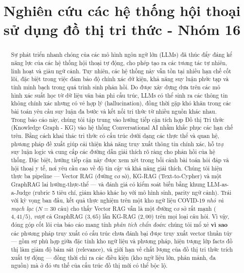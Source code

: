 \documentclass[conference]{IEEEtran}
\begin{document}
\title{Nghiên cứu các hệ thống hội thoại sử dụng đồ thị tri thức - Nhóm 16\\}

\author{
\and
{}
\and
{}
\and
{}
\and
{}
}

\maketitle

\begin{abstract}
Sự phát triển nhanh chóng của các mô hình ngôn ngữ lớn (LLMs) đã thúc đẩy đáng kể năng lực của các hệ thống hội thoại tự động, cho phép tạo ra các tương tác tự nhiên, linh hoạt và giàu ngữ cảnh. Tuy nhiên, các hệ thống này vẫn tồn tại nhiều hạn chế cốt lõi, đặc biệt trong việc đảm bảo độ chính xác dữ kiện, khả năng suy luận phức tạp và tính minh bạch trong quá trình sinh phản hồi. Do được xây dựng dựa trên các mô hình xác suất học từ dữ liệu văn bản phi cấu trúc, LLMs có thể sinh ra các thông tin không chính xác nhưng có vẻ hợp lý (hallucination), đồng thời gặp khó khăn trong các bài toán yêu cầu suy luận đa bước và kết nối tri thức từ nhiều nguồn khác nhau.
Trong báo cáo này, chúng tôi tập trung vào hướng tiếp cận tích hợp Đồ thị Tri thức (Knowledge Graph - KG) vào hệ thống Conversational AI nhằm khắc phục các hạn chế trên. Bằng cách khai thác tri thức có cấu trúc dưới dạng các thực thể và quan hệ, phương pháp đề xuất giúp cải thiện khả năng truy xuất thông tin chính xác, hỗ trợ suy luận logic và cung cấp các đường dẫn giải thích rõ ràng cho phản hồi của hệ thống. Đặc biệt, hướng tiếp cận này được xem xét trong bối cảnh bài toán hỏi đáp và hội thoại y tế, nơi yêu cầu cao về độ tin cậy và khả năng giải thích.
Chúng tôi hiện thực ba pipeline --- Vector RAG (đường cơ sở), KG-RAG (Text-to-Cypher) và một GraphRAG lai hướng-thực-thể --- và đánh giá có kiểm soát biến bằng khung LLM-as-a-Judge (rubric 5 tiêu chí, giám khảo khác họ với mô hình sinh, parity ngữ cảnh). Trái với kỳ vọng ban đầu, kết quả thực nghiệm trên một kho ngữ liệu COVID-19 \emph{nhỏ và mạch lạc} ($N=30$ câu) cho thấy Vector RAG vẫn là một đường cơ sở rất mạnh ($4{,}41/5$), \emph{vượt} cả GraphRAG ($3{,}65$) lẫn KG-RAG ($2{,}00$) trên mọi loại câu hỏi. Vì vậy, đóng góp cốt lõi của báo cáo mang tính \emph{phân tích chẩn đoán}: chúng tôi mổ xẻ \textbf{vì sao} các phương pháp truy xuất có cấu trúc chưa đánh bại được truy xuất vector thuần túy --- gồm sự phù hợp giữa đặc tính kho ngữ liệu và phương pháp, hiện tượng lớp facts đồ thị làm giảm độ bám sát (relevance), và giới hạn về chất lượng của đồ thị tri thức trích xuất tự động --- đồng thời chỉ ra các điều kiện (kho ngữ liệu lớn, phân mảnh, đa nguồn) mà ở đó ưu thế của cấu trúc đồ thị mới có thể bộc lộ.

\end{abstract}
\end{document}
